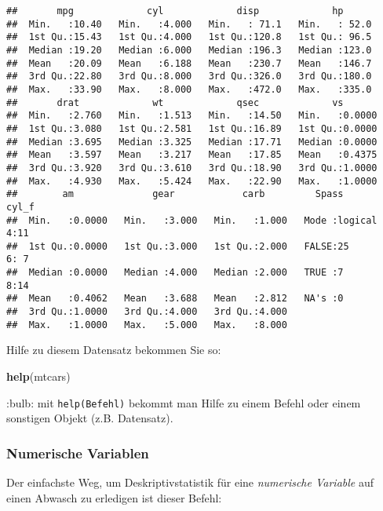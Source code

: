 \documentclass[]{article}
\newenvironment{Shaded}{\begin{snugshade}}{\end{snugshade}}
\newcommand{\KeywordTok}[1]{\textcolor[rgb]{0.13,0.29,0.53}{\textbf{#1}}}
\newcommand{\NormalTok}[1]{#1}
\begin{document}
\begin{verbatim}
##       mpg             cyl             disp             hp       
##  Min.   :10.40   Min.   :4.000   Min.   : 71.1   Min.   : 52.0  
##  1st Qu.:15.43   1st Qu.:4.000   1st Qu.:120.8   1st Qu.: 96.5  
##  Median :19.20   Median :6.000   Median :196.3   Median :123.0  
##  Mean   :20.09   Mean   :6.188   Mean   :230.7   Mean   :146.7  
##  3rd Qu.:22.80   3rd Qu.:8.000   3rd Qu.:326.0   3rd Qu.:180.0  
##  Max.   :33.90   Max.   :8.000   Max.   :472.0   Max.   :335.0  
##       drat             wt             qsec             vs        
##  Min.   :2.760   Min.   :1.513   Min.   :14.50   Min.   :0.0000  
##  1st Qu.:3.080   1st Qu.:2.581   1st Qu.:16.89   1st Qu.:0.0000  
##  Median :3.695   Median :3.325   Median :17.71   Median :0.0000  
##  Mean   :3.597   Mean   :3.217   Mean   :17.85   Mean   :0.4375  
##  3rd Qu.:3.920   3rd Qu.:3.610   3rd Qu.:18.90   3rd Qu.:1.0000  
##  Max.   :4.930   Max.   :5.424   Max.   :22.90   Max.   :1.0000  
##        am              gear            carb         Spass         cyl_f 
##  Min.   :0.0000   Min.   :3.000   Min.   :1.000   Mode :logical   4:11  
##  1st Qu.:0.0000   1st Qu.:3.000   1st Qu.:2.000   FALSE:25        6: 7  
##  Median :0.0000   Median :4.000   Median :2.000   TRUE :7         8:14  
##  Mean   :0.4062   Mean   :3.688   Mean   :2.812   NA's :0               
##  3rd Qu.:1.0000   3rd Qu.:4.000   3rd Qu.:4.000                         
##  Max.   :1.0000   Max.   :5.000   Max.   :8.000
\end{verbatim}

Hilfe zu diesem Datensatz bekommen Sie so:

\begin{Shaded}
\begin{Highlighting}[]
\KeywordTok{help}\NormalTok{(mtcars)}
\end{Highlighting}
\end{Shaded}

:bulb: mit \texttt{help(Befehl)} bekommt man Hilfe zu einem Befehl oder
einem sonstigen Objekt (z.B. Datensatz).

\hypertarget{numerische-variablen}{%
\subsubsection{Numerische Variablen}\label{numerische-variablen}}

Der einfachste Weg, um Deskriptivstatistik für eine \emph{numerische
Variable} auf einen Abwasch zu erledigen ist dieser Befehl:
\end{document}
